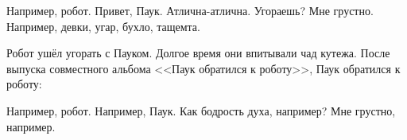 \begin{dialog}
\X Например, робот.
\R Привет, Паук.
\X Атлична-атлична. Угораешь?
\R Мне грустно.
\X Например, девки, угар, бухло, тащемта.
\end{dialog}

\begin{monolog}
Робот ушёл угорать с Пауком. Долгое время они впитывали чад кутежа. После выпуска совместного альбома <<Паук обратился к роботу>>,  Паук обратился к роботу:
\end{monolog}

\begin{dialog}
\X Например, робот.
\R Например, Паук.
\X Как бодрость духа, например?
\R Мне грустно, например.
\end{dialog}
